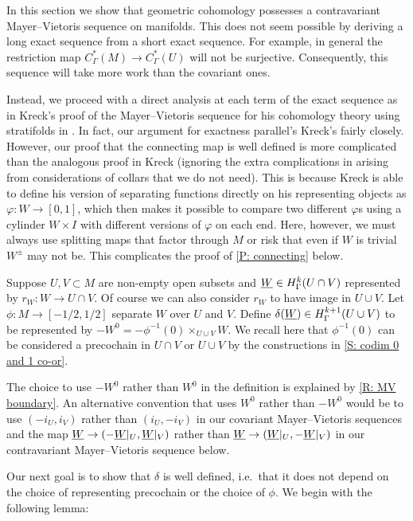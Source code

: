 In this section we show that geometric cohomology possesses a contravariant Mayer--Vietoris sequence on manifolds.
This does not seem possible by deriving a long exact sequence from a short exact sequence.
For example, in general the restriction map $C^*_\Gamma(M) \to C^*_\Gamma(U)$ will not be surjective.
Consequently, this sequence will take more work than the covariant ones.

Instead, we proceed with a direct analysis at each term of the exact sequence as in Kreck's proof of the Mayer--Vietoris sequence for his cohomology theory using stratifolds in \cite{Krec10}.
In fact, our argument for exactness parallel's Kreck's fairly closely.
However, our proof that the connecting map is well defined is more complicated than the analogous proof in Kreck (ignoring the extra complications in \cite{Krec10} arising from considerations of collars that we do not need).
This is because Kreck is able to define his version of separating functions directly on his representing objects as $\varphi \colon W \to [0,1]$, which then makes it possible to compare two different $\varphi$s using a cylinder $W \times I$ with different versions of $\varphi$ on each end.
Here, however, we must always use splitting maps that factor through $M$ or risk that even if $W$ is trivial $W^{\pm}$ may not be.
This complicates the proof of \cref{P: connecting} below.

\begin{definition}
	Suppose $U,V \subset M$ are non-empty open subsets and $\underline{W} \in H^k_\Gamma(U \cap V)$ represented by $r_W \colon W \to U \cap V$.
	Of course we can also consider $r_W$ to have image in $U \cup V$.
	Let $\phi \colon M \to [-1/2,1/2]$ separate $W$ over $U$ and $V$.
	Define $\delta(\underline{W}) \in H^{k+1}_\Gamma(U \cup V)$ to be represented by $-W^0 = -\phi^{-1}(0)\times_{U \cup V}W$.
	We recall here that $\phi^{-1}(0)$ can be considered a precochain in $U \cap V$ or $U \cup V$ by the constructions in \cref{S: codim 0 and 1 co-or}.
\end{definition}

The choice to use $-W^0$ rather than $W^0$ in the definition is explained by \cref{R: MV boundary}.
An alternative convention that uses $W^0$ rather than $-W^0$ would be to use $(-i_U,i_V)$ rather than $(i_U,-i_V)$ in our covariant Mayer--Vietoris sequences and the map $\underline{W} \to (-\underline{W}|_U, \underline{W}|_V)$ rather than $\underline{W} \to (\underline{W}|_U, -\underline{W}|_V)$ in our contravariant Mayer--Vietoris sequence below.

Our next goal is to show that $\delta$ is well defined, i.e.\ that it does not depend on the choice of representing precochain or the choice of $\phi$.
We begin with the following lemma:

